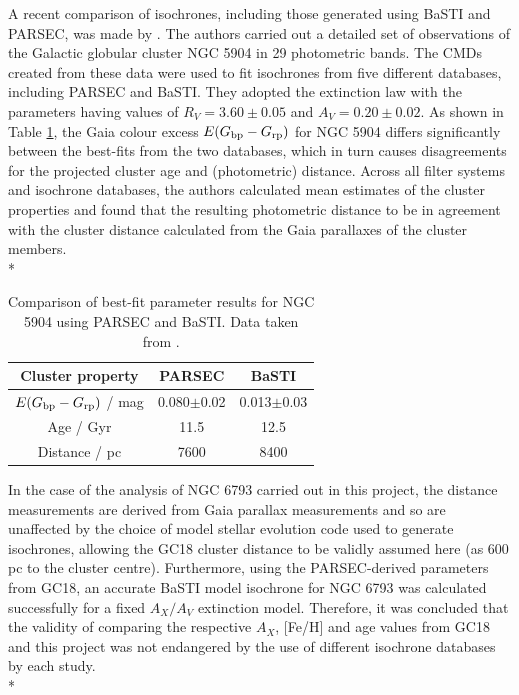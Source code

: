 \documentclass[12pt, a4paper]{report}
\begin{document}
A recent comparison of isochrones, including those generated using BaSTI and PARSEC, was made by \cite{2019MNRAS.483.4949G}. The authors carried out a detailed set of observations of the Galactic globular cluster NGC 5904 in 29 photometric bands. The CMDs created from these data were used to fit isochrones from five different databases, including PARSEC and BaSTI. They adopted the \cite{1989ApJ...345..245C} extinction law with the parameters having values of $R_{V} = 3.60\pm0.05$ and $A_{V} = 0.20\pm0.02$. As shown in Table \ref{NGC5904_obs_gontcharov}, the Gaia colour excess $E(G_{\textnormal{bp}} - G_{\textnormal{rp}})$ for NGC 5904 differs significantly between the best-fits from the two databases, which in turn causes disagreements for the projected cluster age and (photometric) distance. Across all filter systems and isochrone databases, the authors calculated mean estimates of the cluster properties and found that the resulting photometric distance to be in agreement with the cluster distance calculated from the Gaia parallaxes of the cluster members.\\*

\begin{table}
\begin{center}
\begin{tabular}{ccc}
\hline
Cluster property & PARSEC & BaSTI \\
\hline
$E(G_{\textnormal{bp}} - G_{\textnormal{rp}})$ / mag & 0.080$\pm$0.02 & 0.013$\pm$0.03 \\
Age / Gyr & 11.5 & 12.5 \\
Distance / pc & 7600 & 8400 \\
\hline
\end{tabular}
\caption{Comparison of best-fit parameter results for NGC 5904 using PARSEC and BaSTI. Data taken from \cite{2019MNRAS.483.4949G}.}
\label{NGC5904_obs_gontcharov}
\end{center}
\end{table}

In the case of the analysis of NGC 6793 carried out in this project, the distance measurements are derived from Gaia parallax measurements and so are unaffected by the choice of model stellar evolution code used to generate isochrones, allowing the GC18 cluster distance to be validly assumed here (as 600 pc to the cluster centre). Furthermore, using the PARSEC-derived parameters from GC18, an accurate BaSTI model isochrone for NGC 6793 was calculated successfully for a fixed $A_{X}/A_{V}$ extinction model. Therefore, it was concluded that the validity of comparing the respective $A_{X}$, [Fe/H] and age values from GC18 and this project was not endangered by the use of different isochrone databases by each study.\\*
\end{document}
